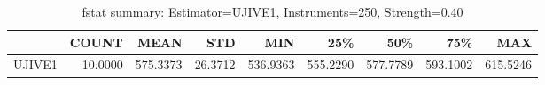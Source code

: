 \begin{table}[ht]
\centering
\caption{fstat summary: Estimator=UJIVE1, Instruments=250, Strength=0.40}
\begin{tabular}{lrrrrrrrr}
\toprule
 & COUNT & MEAN & STD & MIN & 25\% & 50\% & 75\% & MAX \\
\midrule
UJIVE1 & 10.0000 & 575.3373 & 26.3712 & 536.9363 & 555.2290 & 577.7789 & 593.1002 & 615.5246 \\
\bottomrule
\end{tabular}
\end{table}
